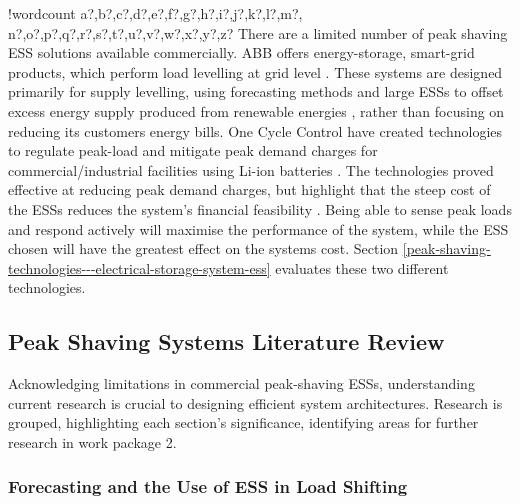 \documentclass[fontsize=9.5pt]{extarticle}
\numberwithin{figure}{section} %
\newcounter{words}
\newenvironment{counted}{%
  \setcounter{words}{0}
  \SearchList!{wordcount}{\stepcounter{words}}
    {a?,b?,c?,d?,e?,f?,g?,h?,i?,j?,k?,l?,m?,
    n?,o?,p?,q?,r?,s?,t?,u?,v?,w?,x?,y?,z?}
  \UndoBoundary{'}
  \SearchOrder{p;}}{%
  \StopSearching}
\begin{document}
\begin{counted}
There are a limited number of peak shaving ESS solutions available
commercially. ABB offers energy-storage, smart-grid products, which
perform load levelling at grid level \cite{abbpeakshave}. These systems
are designed primarily for supply levelling, using forecasting methods
and large ESSs to offset excess energy supply produced from renewable
energies \cite{5559470}, rather than focusing on reducing its customers
energy bills. One Cycle Control have created technologies to regulate
peak-load and mitigate peak demand charges for commercial/industrial
facilities using Li-ion batteries \cite{peakload38:online}. The
technologies proved effective at reducing peak demand charges, but
highlight that the steep cost of the ESSs reduces the system's financial
feasibility \cite{Demonstr51:online}. Being able to sense peak loads and
respond actively will maximise the performance of the system, while the
ESS chosen will have the greatest effect on the systems cost. Section
\ref{peak-shaving-technologies---electrical-storage-system-ess}
evaluates these two different technologies.

\subsection{Peak Shaving Systems Literature
Review}\label{peak-shaving-systems-literature-review}

Acknowledging limitations in commercial peak-shaving ESSs, understanding
current research is crucial to designing efficient system architectures.
Research is grouped, highlighting each section's significance,
identifying areas for further research in work package 2.

\subsubsection{Forecasting and the Use of ESS in Load
Shifting}\label{forecasting-and-the-use-of-ess-in-load-shifting}


\end{counted}
\end{document}
